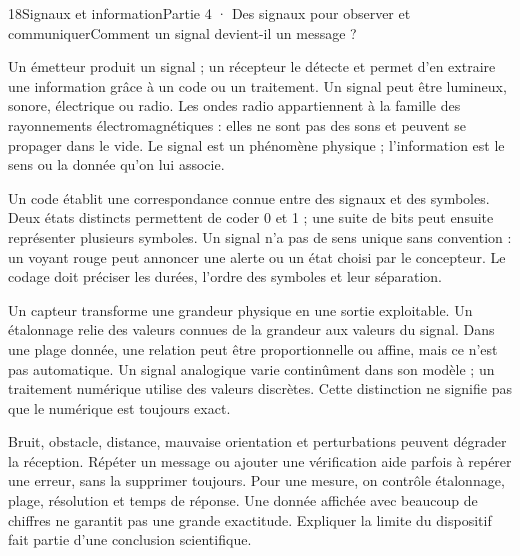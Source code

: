 \begin{ouverture}[college4]{18}{Signaux et information}{Partie 4 · Des signaux pour observer et communiquer}{Comment un signal devient-il un message ?}
\end{ouverture}
\label{ess-18}
Un émetteur produit un signal ; un récepteur le détecte et permet d’en extraire une information grâce à un code ou un traitement. Un signal peut être lumineux, sonore, électrique ou radio. Les ondes radio appartiennent à la famille des rayonnements électromagnétiques : elles ne sont pas des sons et peuvent se propager dans le vide. Le signal est un phénomène physique ; l’information est le sens ou la donnée qu’on lui associe.\par
{}
Un code établit une correspondance connue entre des signaux et des symboles. Deux états distincts permettent de coder 0 et 1 ; une suite de bits peut ensuite représenter plusieurs symboles. Un signal n’a pas de sens unique sans convention : un voyant rouge peut annoncer une alerte ou un état choisi par le concepteur. Le codage doit préciser les durées, l’ordre des symboles et leur séparation.\par
\clearpage
{}
Un capteur transforme une grandeur physique en une sortie exploitable. Un étalonnage relie des valeurs connues de la grandeur aux valeurs du signal. Dans une plage donnée, une relation peut être proportionnelle ou affine, mais ce n’est pas automatique. Un signal analogique varie continûment dans son modèle ; un traitement numérique utilise des valeurs discrètes. Cette distinction ne signifie pas que le numérique est toujours exact.\par
{}
Bruit, obstacle, distance, mauvaise orientation et perturbations peuvent dégrader la réception. Répéter un message ou ajouter une vérification aide parfois à repérer une erreur, sans la supprimer toujours. Pour une mesure, on contrôle étalonnage, plage, résolution et temps de réponse. Une donnée affichée avec beaucoup de chiffres ne garantit pas une grande exactitude. Expliquer la limite du dispositif fait partie d’une conclusion scientifique.\par
